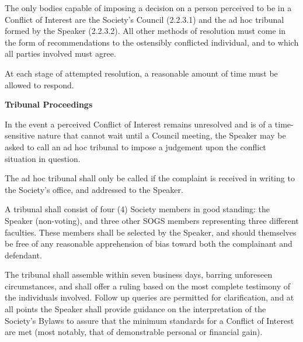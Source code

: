 \begin{longenum}[ label*=\arabic*., align=left]
\begin{longenum}[ label*=\arabic*., align=left]
\begin{longenum}[ label*=\arabic*., align=left]
		\end{longenum}
		\item The only bodies capable of imposing a decision on a person perceived to be in a Conflict of Interest are the Society's Council (2.2.3.1) and the ad hoc tribunal formed by the Speaker (2.2.3.2). All other methods of resolution must come in the form of recommendations to the ostensibly conflicted individual, and to which all parties involved must agree.
        \item At each stage of attempted resolution, a reasonable amount of time must be allowed to respond.
	\end{longenum}
	\item \textbf{Tribunal Proceedings}
	\begin{longenum}[ label*=\arabic*., align=left]
		\item In the event a perceived Conflict of Interest remains unresolved and is of a time-sensitive nature that cannot wait until a Council meeting, the Speaker may be asked to call an ad hoc tribunal to impose a judgement upon the conflict situation in question.
        \item The ad hoc tribunal shall only be called if the complaint is received in writing to the Society's office, and addressed to the Speaker.

        \item A tribunal shall consist of four (4) Society members in good standing: the Speaker (non-voting), and three other SOGS members representing three different faculties. These members shall be selected by the Speaker, and should themselves be free of any reasonable apprehension of bias toward both the complainant and defendant.

        \item The tribunal shall assemble within seven business days, barring unforeseen circumstances, and shall offer a ruling based on the most complete testimony of the individuals involved. Follow up queries are permitted for clarification, and at all points the Speaker shall provide guidance on the interpretation of the Society's Bylaws to assure that the minimum standards for a Conflict of Interest are met (most notably, that of demonstrable personal or financial gain).



\end{longenum}
\end{longenum}
